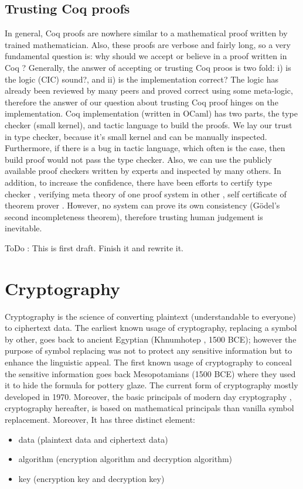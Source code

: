  \subsection{Trusting Coq proofs}
 \label{sec:coqproof}
  In general, Coq proofs are nowhere similar to a mathematical 
  proof written by trained mathematician. Also, these proofs 
  are verbose and fairly long, so a 
  very fundamental question is: why should we 
  accept or believe in a proof written in Coq \citep{pollack1998believe}?  Generally, the answer of 
	accepting or trusting Coq proos is two fold:
  i) is the logic (CIC) sound?, and ii) is the implementation correct?
  The logic has already been reviewed by many peers and proved correct 
  using some meta-logic, therefore the answer of our question about trusting Coq proof 
  hinges on the implementation. 
  Coq implementation (written in OCaml)  has two parts, the type checker (small kernel), 
  and tactic language to build the proofs.
  We lay our trust in type checker, because it's small kernel and can be 
  manually inspected. Furthermore, if there
  is a bug in tactic language, which often is the case, then build proof would 
  not pass the type checker.  Also, we can use the publicly available proof 
  checkers written by experts and inspected by many others. In addition, to increase the 
  confidence, there have been 
  efforts to certify type checker \citep{Appel2003}
  \citep{barras1996coq}, verifying meta theory of one proof system 
  in other \citep{10.1007/978-3-319-08970-6_3}, self certificate of 
  theorem prover \citep{10.1007/11814771_17}. However, no system can 
  prove its own consistency (G{\"o}del's second incompleteness theorem), therefore
  trusting human judgement is inevitable.
  
 
    
   ToDo : This is first draft. Finish it and rewrite it. 
\section{Cryptography}
    Cryptography is the science of converting plaintext (understandable to everyone) to ciphertext data. 
    The earliest known usage of cryptography, replacing a symbol by other,  goes back to  ancient 
    Egyptian (Khnumhotep  , 1500 BCE); however the purpose of symbol replacing was not to protect
    any sensitive information but to enhance the linguistic appeal. The first known usage of 
    cryptography to conceal the sensitive information goes back Mesopotamians (1500 BCE) where 
    they used it to hide the formula for pottery glaze.  The current form of cryptography mostly 
    developed in 1970. Moreover, the basic principals of modern day cryptography , cryptography hereafter, is based on 
    mathematical principals than vanilla symbol replacement.  Moreover, It has three distinct 
    element:
    \begin{itemize}
    \item data (plaintext data and ciphertext data)
    \item algorithm (encryption algorithm and decryption algorithm)
    \item key (encryption key and decryption key)
    \end{itemize}
    
